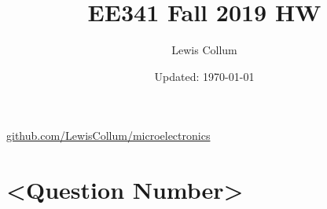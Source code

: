 \documentclass[fleqn]{article}
\author{Lewis Collum}
\date{Updated: \today}
\title{EE341 Fall 2019 HW \jobname}
\begin{document}
\maketitle
\href{https://github.com/LewisCollum/microelectronics}{github.com/LewisCollum/microelectronics}

\section*{<Question Number>}
\label{sec:orgda6e12d}
\end{document}
